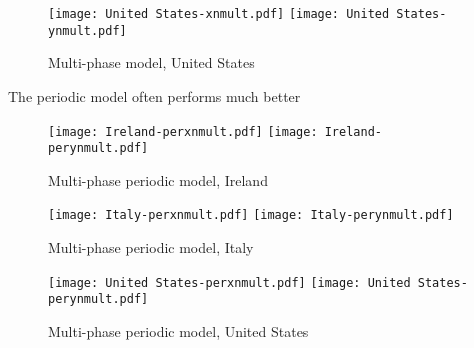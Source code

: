 \begin{figure}[H]
  \texttt{[image: United States-xnmult.pdf]} \label{fig:usa-xnmult}
\endminipage\hfill
{}
  \texttt{[image: United States-ynmult.pdf]} \label{fig:usa-ynmult}
\endminipage
\caption{Multi-phase model, United States}
\end{figure}


The periodic model often performs much better

\begin{figure}[H]
  \texttt{[image: Ireland-perxnmult.pdf]} \label{fig:ireland-perxnmult}
\endminipage\hfill
{}
  \texttt{[image: Ireland-perynmult.pdf]} \label{fig:ireland-perynmult}
\endminipage
\caption{Multi-phase periodic model, Ireland}
\end{figure}

\begin{figure}[H]
  \texttt{[image: Italy-perxnmult.pdf]} \label{fig:italy-perxnmult}
\endminipage\hfill
{}
  \texttt{[image: Italy-perynmult.pdf]} \label{fig:italy-perynmult}
\endminipage
\caption{Multi-phase periodic model, Italy}
\end{figure}

\begin{figure}[H]
  \texttt{[image: United States-perxnmult.pdf]} \label{fig:usa-perxnmult}
\endminipage\hfill
{}
  \texttt{[image: United States-perynmult.pdf]} \label{fig:usa-perynmult}
\endminipage
\caption{Multi-phase periodic model, United States}
\end{figure}
